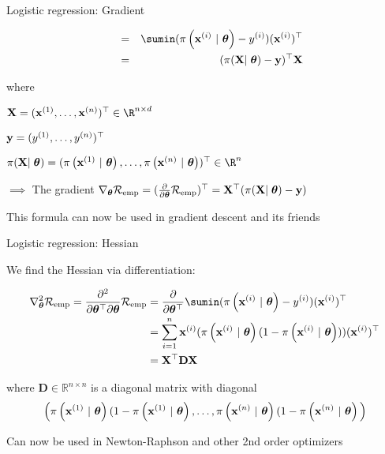 \documentclass[11pt,compress,t,notes=noshow, xcolor=table]{beamer}
\begin{document}
\begin{frame}{Logistic regression: Gradient}

\begin{align*}
\quad &=& 
\sumin (\pixit - \yi)(\xi)^\top\\
\quad &=& 
(\pi(\mathbf{X}\vert\;\thetav) - \mathbf{y})^\top\mathbf{X}\\
\end{align*}

where

\begin{itemizeM}
\item $\mathbf{X} = (
\xi[1], \dots, 
\xi[n])^\top \in \R^{n\times d}$
\item $\mathbf{y} = (
\yi[1], \dots,\yi[n])^\top$
\item $\pi(\mathbf{X}\vert\;\thetav) = (
\pixit[1], \dots,
\pixit[n]
)^\top \in \R^{n}$
\end{itemizeM}

\vfill

$\implies$ The gradient $\nabla_{\thetav}\riske = (\frac{\partial}{\partial\thetav}\riske)^\top =  \mathbf{X}^\top(\pi(\mathbf{X}\vert\;\thetav) - \mathbf{y})$ 

\vfill

This formula can now be used in gradient descent and its friends

\end{frame}


\begin{frame}{Logistic regression: Hessian}

We find the Hessian via differentiation:

{\small
\begin{align*}
\nabla^2_{\thetav}\riske  = \frac{\partial^2}{\partial{\thetav^\top}\partial\thetav}\riske  & =  
\frac{\partial}{\partial{\thetav^\top}} \sumin (\pixit - \yi)(\xi)^\top\\
& =  
\sum^n_{i=1}\xi (\pixit(1-\pixit))(\xi)^\top\\
& =  
\mathbf{X}^\top \mathbf{D} \mathbf{X}\\
\end{align*}

where $\mathbf{D} \in \mathbb{R}^{n\times n}$ is a diagonal matrix with diagonal 
$$\Big(\pixit[1](1-\pixit[1], \dots, \pixit[n](1-\pixit[n]\Big)$$
}

Can now be used in Newton-Raphson and other 2nd order optimizers


\end{frame}
\end{document}
